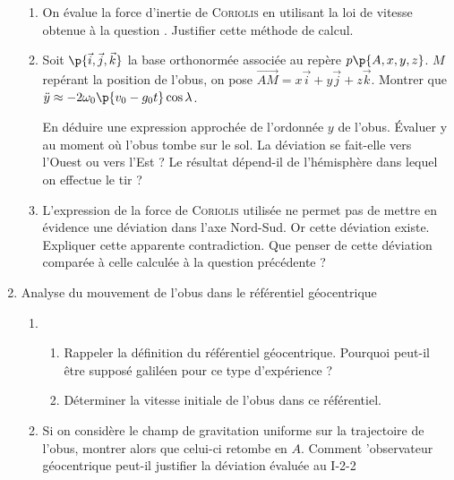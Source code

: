 \documentclass[a4paper,french,bookmarks]{article}
\begin{document}
\begin{enumerate}[resume]
\begin{enumerate}
            \item On évalue la force d'inertie de \textsc{Coriolis} en utilisant la loi de vitesse obtenue à la question .
            Justifier cette méthode de calcul.

            \item Soit $\p{\vec i, \vec j, \vec k}$ la base orthonormée associée au repère $p\p{A, x, y, z}$. $M$ repérant la position de l'obus, on pose $\vec{AM} = x\vec i + y\vec j + z\vec k$. Montrer que $\ddot y \approx -2\omega_0\p{v_0 - g_0t}\cos \lambda $.

            En déduire une expression approchée de l'ordonnée $y$ de l'obus. Évaluer y au moment où l'obus tombe sur le sol. La déviation se fait-elle vers l'Ouest ou vers l'Est ? Le résultat dépend-il de l'hémisphère dans lequel on effectue le tir ?

            \item L'expression de la force de \textsc{Coriolis} utilisée ne permet pas de mettre en évidence une déviation dans l'axe Nord-Sud. Or cette déviation existe. Expliquer cette apparente contradiction. Que penser de cette déviation comparée à celle calculée à la question précédente ?
            
        \end{enumerate}

        \item Analyse du mouvement de l'obus dans le référentiel géocentrique

        \begin{enumerate}
            \item 
            \begin{enumerate}
                \item Rappeler la définition du référentiel géocentrique. Pourquoi peut-il être supposé galiléen pour ce type d'expérience ? 

                \item Déterminer la vitesse initiale de l'obus dans ce référentiel.
            \end{enumerate}
            \item Si on considère le champ de gravitation uniforme sur la trajectoire de l'obus, montrer alors que celui-ci retombe en $A$. Comment 'observateur géocentrique peut-il justifier la déviation évaluée au I-2-2
        \end{enumerate}
    \end{enumerate}
    
\end{document}
